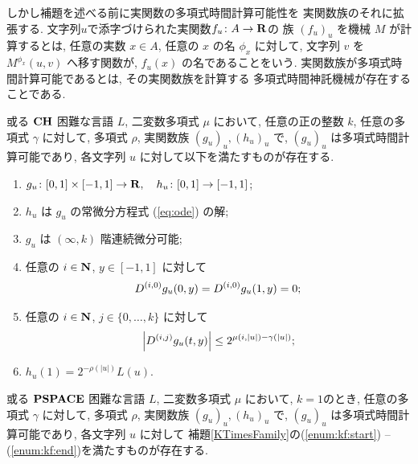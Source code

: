 しかし補題を述べる前に実関数の多項式時間計算可能性を
実関数族のそれに拡張する.
文字列$u$で添字づけられた実関数$f _u \colon A \to \mathbf R$の
族 $(f_u)_u$ を機械 $M$ が計算するとは,
任意の実数 $x \in A$, 任意の $x$ の名 $\phi_x$ に対して,
文字列 $v$ を $M ^{\phi _x} (u, v)$ へ移す関数が, 
$f _u (x)$ の名であることをいう.
実関数族が多項式時間計算可能であるとは, その実関数族を計算する
多項式時間神託機械が存在することである.

 \begin{lemma}
  \label{KTimesFamily}
  或る $\mathbf{CH}$ 困難な言語 $L$,
  二変数多項式 $\mu$ において,
  任意の正の整数 $k$,
  任意の多項式 $\gamma$ に対して,
  多項式 $\rho$, 実関数族 $(g_u)_u, (h_u)_u$ で, 
  $(g_u)_u$ は多項式時間計算可能であり,
  各文字列 $u$ に対して以下を満たすものが存在する.

  \begin{enumerate}
   \item \label{enum:kf:start}
     $g_u\colon [0,1] \times [-1,1]\to \mathbf R, \quad h_u\colon [0,1] \to [-1,1]$; 
   \item $h_u$ は $g_u$ の常微分方程式 (\ref{eq:ode}) の解;
   \item $g_u$ は $(\infty, k)$ 階連続微分可能;
   \item \label{enum:boundary}
	 任意の $i \in \mathbf N$, $y \in [-1,1]$ に対して
	 \begin{equation*}
	  D^{(i, 0)} g_u(0,y) = D^{(i, 0)} g_u(1,y) = 0 ;
	 \end{equation*}
   \item \label{enum:inftyk}
	 任意の $i \in \mathbf N$, $j \in \{0, \dots, k\}$ に対して
	 \begin{equation*}
	  \left|D^{(i,j)} g_u(t,y)\right| \le 2^{\mu(i, |u|) - \gamma(|u|)};
	 \end{equation*}
   \item \label{enum:kf:end}
	 $h_u(1) = 2^{-\rho(|u|)}L(u)$.
  \end{enumerate}
 \end{lemma}

\begin{lemma}
 \label{DifferentiableFamily}
 或る $\mathbf{PSPACE}$ 困難な言語 $L$,
 二変数多項式 $\mu$ において,
 $k = 1$のとき,
 任意の多項式 $\gamma$ に対して,
 多項式 $\rho$, 実関数族 $(g_u)_u, (h_u)_u$ で, 
 $(g_u)_u$ は多項式時間計算可能であり,
 各文字列 $u$ に対して
 補題\ref{KTimesFamily}の(\ref{enum:kf:start}) -- (\ref{enum:kf:end})を満たすものが存在する.
\end{lemma}



